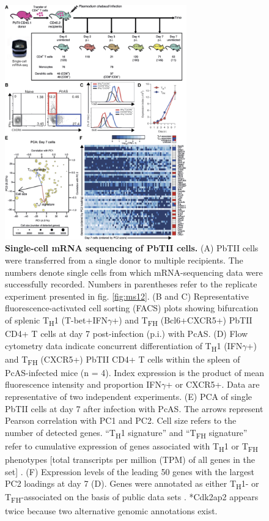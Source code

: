 \begin{figure}
    \centering
    \includegraphics[width=0.7\textwidth]{"Fig1"}
    \caption[Single-cell mRNA sequencing of PbTII cells]{\textbf{Single-cell mRNA sequencing of PbTII cells.} (A) PbTII cells were transferred from a single donor to multiple recipients. The numbers denote single cells from which mRNA-sequencing data were successfully recorded. Numbers in parentheses refer to the replicate experiment presented in fig. \ref{fig:ms12}. (B and C) Representative fluorescence-activated cell sorting (FACS) plots showing bifurcation of splenic T\textsubscript{H}1 (T-bet+IFN\( \gamma \)+) and T\textsubscript{FH} (Bcl6+CXCR5+) PbTII CD4+ T cells at day 7 post-infection (p.i.) with PcAS. (D) Flow cytometry data indicate concurrent differentiation of T\textsubscript{H}1 (IFN\( \gamma \)+) and T\textsubscript{FH} (CXCR5+) PbTII CD4+ T cells within the spleen of PcAS-infected mice (n = 4). Index expression is the product of mean fluorescence intensity and proportion IFN\( \gamma \)+ or CXCR5+. Data are representative of two independent experiments. (E) PCA of single PbTII cells at day 7 after infection with PcAS. The arrows represent Pearson correlation with PC1 and PC2. Cell size refers to the number of detected genes. “T\textsubscript{H}1 signature” and “T\textsubscript{FH} signature” refer to cumulative expression of genes associated with T\textsubscript{H}1 or T\textsubscript{FH} phenotypes [total transcripts per million (TPM) of all genes in the set] \cite{Hale2013-yb}. (F) Expression levels of the leading 50 genes with the largest PC2 loadings at day 7 (D). Genes were annotated as either T\textsubscript{H}1- or T\textsubscript{FH}-associated on the basis of public data sets \cite{Hale2013-yb, Liu2012-vw, Marshall2011-si, Stubbington2015-do}. *Cdk2ap2 appears twice because two alternative genomic annotations exist.}
    \label{fig:timecourse}
\end{figure}


